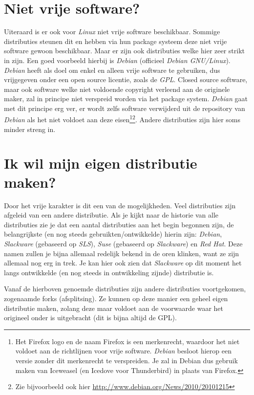 \section{Niet vrije software?}
Uiteraard is er ook voor \emph{Linux} niet vrije software beschikbaar. Sommige distributies steunen dit en hebben via hun package systeem deze niet vrije software gewoon beschikbaar. Maar er zijn ook distributies welke hier zeer strikt in zijn. Een goed voorbeeld hierbij is \emph{Debian} (officieel \emph{Debian GNU/Linux}). \emph{Debian} heeft als doel om enkel en alleen vrije software te gebruiken, dus vrijgegeven onder een open source licentie, zoals de \emph{GPL}. Closed source software, maar ook software welke niet voldoende copyright verleend aan de originele maker, zal in principe niet verspreid worden via het package system. \emph{Debian} gaat met dit principe erg ver, er wordt zelfs software verwijderd uit de repository van \emph{Debian} als het niet voldoet aan deze eisen\footnote{Het Firefox logo en de naam Firefox is een merkenrecht, waardoor het niet voldoet aan de richtlijnen voor vrije software. \emph{Debian} besloot hierop een versie zonder dit merkenrecht te verspreiden. Je zal in Debian dus gebruik maken van Iceweasel (en Icedove voor Thunderbird) in plaats van Firefox.}\footnote{Zie bijvoorbeeld ook hier \url{http://www.debian.org/News/2010/20101215}}. Andere distributies zijn hier soms minder streng in.

\section{Ik wil mijn eigen distributie maken?}
Door het vrije karakter is dit een van de mogelijkheden. Veel distributies zijn afgeleid van een andere distributie. Als je kijkt naar de historie van alle distributies \cite{bib.wiki.timeline} zie je dat een aantal distributies aan het begin begonnen zijn, de belangrijkste (en nog steeds gebruikten/ontwikkelde) hierin zijn: \emph{Debian}, \emph{Slackware} (gebaseerd op \emph{SLS}), \emph{Suse} (gebaseerd op \emph{Slackware}) en \emph{Red Hat}. Deze namen zullen je bijna allemaal redelijk bekend in de oren klinken, want ze zijn allemaal nog erg in trek. Je kan hier ook zien dat \emph{Slackware} op dit moment het langs ontwikkelde (en nog steeds in ontwikkeling zijnde) distributie is. 

Vanaf de hierboven genoemde distributies zijn andere distributies voortgekomen, zogenaamde forks (afsplitsing). Ze kunnen op deze manier een geheel eigen distributie maken, zolang deze maar voldoet aan de voorwaarde waar het origineel onder is uitgebracht (dit is bijna altijd de GPL).

